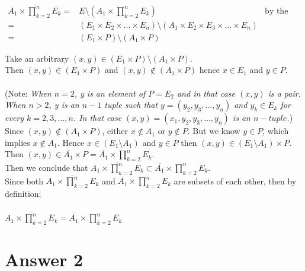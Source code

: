 \documentclass[12pt]{article}
\begin{document}
\begin{enumerate}[label=(\alph*)]
\begin{enumerate}[label=(\roman*)]
\begin{align*}
	\overline{A_1\times \prod_{k=2}^{n} E_k} = & E\setminus (A_1\times \prod_{k=2}^{n} E_k) &\text{by the definition of compl.}\\
											 = & (E_1\times E_2\times\dots \times E_n)\setminus (A_1\times E_2\times E_3\times\dots \times E_n)\\
											 = & (E_1\times P)\setminus (A_1\times P)
\end{align*}	

Take an arbitrary $(x,y)\in (E_1\times P)\setminus (A_1\times P)$.\\
Then $(x,y)\in (E_1\times P)$ and $(x,y)\notin (A_1\times P)$ hence $x\in E_1$ and $y\in P$.\\ \\
(Note: \textit{When $n=2$, y is an element of $P=E_2$ and in that case $(x,y)$ is a pair.\\
When $n>2$, y is an $n-1$ tuple such that $y=(y_2, y_3,\dots, y_n)$ and $y_k\in E_k$ for every $k=2,3,\dots,n$. In that case $(x,y)=(x_1, y_2, y_3,\dots, y_n)$ is an $n-tuple$.})\\

Since $(x,y)\notin (A_1\times P)$, either $x\notin A_1$ or $y\notin P$. But we know $y\in P$, which implies $x\notin A_1$. Hence $x\in (E_1\setminus A_1)$ and $y\in P$ then $(x,y)\in (E_1\setminus A_1)\times P$. Then $(x,y)\in \overline{A_1}\times P = \overline{A_1}\times \prod_{k=2}^{n} E_k$.\\
Then we conclude that  $\overline{A_1\times \prod_{k=2}^{n} E_k} \subset  \overline{A_1}\times \prod_{k=2}^{n} E_k$.\\

Since both $\overline{A_1\times \prod_{k=2}^{n} E_k}$ and $\overline{A_1}\times \prod_{k=2}^{n} E_k$ are subsets of each other, then by definition;\\  \\
$\overline{A_1\times \prod_{k=2}^{n} E_k} = \overline{A_1}\times \prod_{k=2}^{n} E_k$

\end{enumerate}

\end{enumerate}

\section*{Answer 2}
\end{document}
